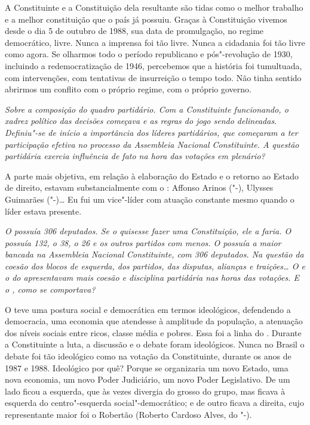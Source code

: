 A Constituinte e a Constituição dela resultante são tidas como o melhor
trabalho e a melhor constituição que o país já possuiu. Graças à
Constituição vivemos desde o dia 5 de outubro de 1988, sua data de
promulgação, no regime democrático, livre. Nunca a imprensa foi tão
livre. Nunca a cidadania foi tão livre como agora. Se olharmos todo o
período republicano e pós"-revolução de 1930, incluindo a
redemocratização de 1946, percebemos que a história foi tumultuada, com
intervenções, com tentativas de insurreição o tempo todo. Não tinha
sentido abrirmos um conflito com o próprio regime, com o próprio
governo.

\medskip

\noindent\emph{Sobre a composição do quadro partidário. Com a Constituinte
funcionando, o xadrez político das decisões começava e as regras do
jogo sendo delineadas. Definiu"-se de início a importância dos líderes
partidários, que começaram a ter participação efetiva no processo da
Assembleia Nacional Constituinte. A questão partidária exercia
influência de fato na hora das votações em plenário?}

A parte mais objetiva, em relação à elaboração do
Estado e o retorno ao Estado de direito, estavam substancialmente com o
: Affonso Arinos ("-), Ulysses Guimarães ("-)\ldots{} Eu fui um vice"-líder com atuação constante mesmo quando o líder estava presente.

\medskip

\noindent\emph{O  possuía 306 deputados. Se o  quisesse fazer uma
Constituição, ele a faria. O  possuía 132, o  38, o  26 e os
outros partidos com menos. O  possuía a maior bancada na Assembleia
Nacional Constituinte, com 306 deputados. Na questão da coesão dos
blocos de esquerda, dos partidos, das disputas, alianças e traições\ldots{} O
 e o do apresentavam mais coesão e disciplina partidária nas horas
das votações. E o , como se comportava?}

O  teve uma postura social e democrática em termos
ideológicos, defendendo a democracia, uma economia que atendesse à
amplitude da população, a atenuação dos níveis sociais entre ricos,
classe média e pobres. Essa foi a linha do . Durante a Constituinte
a luta, a discussão e o debate foram ideológicos. Nunca no Brasil o
debate foi tão ideológico como na votação da Constituinte, durante os
anos de 1987 e 1988. Ideológico por quê? Porque se organizaria um novo
Estado, uma nova economia, um novo Poder Judiciário, um novo Poder
Legislativo. De um lado ficou a esquerda, que às vezes divergia do
grosso do grupo, mas ficava à esquerda do centro"-esquerda
social"-democrático; e de outro ficava a direita, cujo representante
maior foi o Robertão (Roberto Cardoso Alves, do "-).

